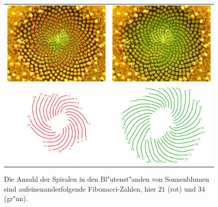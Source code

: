 \begin{figure}
\begin{center}
\begin{tabular}{cc}
\includegraphics[width=0.47\hsize]{graphics/helianthus-fibonacci2.jpg}&%
\includegraphics[width=0.47\hsize]{graphics/helianthus-fibonacci3.jpg}\\%
\includegraphics[width=0.47\hsize]{graphics/helianthus-fibonacci5.jpg}&%
\includegraphics[width=0.47\hsize]{graphics/helianthus-fibonacci4.jpg}
\end{tabular}
\end{center}
\caption{Die Anzahl der Spiralen in den Bl"utenst"anden von Sonnenblumen
sind aufeinenanderfolgende Fibonacci-Zahlen, hier $21$ (rot) und $34$ (gr"un).
\label{helianthus}}
\end{figure}

